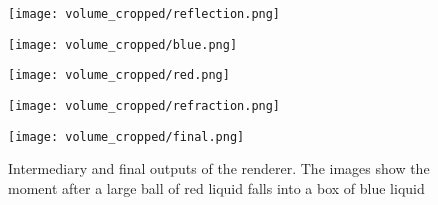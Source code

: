 \begin{figure}[H]
    \centering
    \begin{minipage}[t]{.65\linewidth}
            \vspace{0pt}
            \centering
            \texttt{[image: volume\_cropped/reflection.png]}
    \end{minipage}
    
    \hspace{2pt}

    \begin{minipage}[t]{.65\linewidth}
            \vspace{0pt}
            \centering
            \texttt{[image: volume\_cropped/blue.png]}
    \end{minipage}

    \hspace{2pt}
    
    \begin{minipage}[t]{.65\linewidth}
            \vspace{0pt}
            \centering
            \texttt{[image: volume\_cropped/red.png]}
    \end{minipage}

    \hspace{2pt}
            
    
    \begin{minipage}[t]{.65\linewidth}
            \vspace{0pt}
            \centering
            \texttt{[image: volume\_cropped/refraction.png]}
    \end{minipage}

    \hspace{2pt}

    \begin{minipage}[t]{.65\linewidth}
            \vspace{0pt}
            \centering
            \texttt{[image: volume\_cropped/final.png]}
    \end{minipage}

    \hspace{2pt}
            

    \caption{Intermediary and final outputs of the renderer. The images show the moment after a large ball of red liquid falls into a box of blue liquid}
    \label{figure volume render}
\end{figure}


\addtolength{\topmargin}{.875in}
